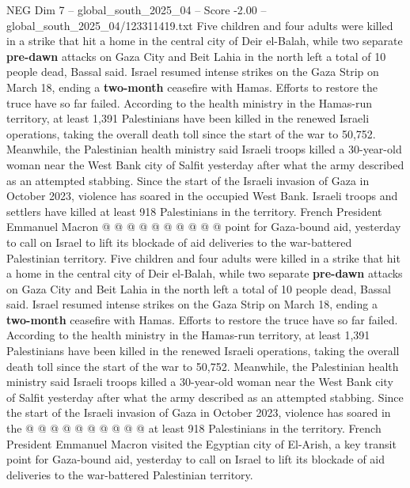 \begin{textsample}{NEG Dim 7 – global\_south\_2025\_04 – Score -2.00 – global\_south\_2025\_04/123311419.txt}  \label{ex:f7_neg_047}
Five children and four adults were killed in a strike that hit a home in the central city of Deir el-Balah, while two separate \textbf{pre-dawn} attacks on Gaza City and Beit Lahia in the north left a total of 10 people dead, Bassal said.
Israel resumed intense strikes on the Gaza Strip on March 18, ending a \textbf{two-month} ceasefire with Hamas.
Efforts to restore the truce have so far failed.
According to the health ministry in the Hamas-run territory, at least 1,391 Palestinians have been killed in the renewed Israeli operations, taking the overall death toll since the start of the war to 50,752.
Meanwhile, the Palestinian health ministry said Israeli troops killed a 30-year-old woman near the West Bank city of Salfit yesterday after what the army described as an attempted stabbing.
Since the start of the Israeli invasion of Gaza in October 2023, violence has soared in the occupied West Bank.
Israeli troops and settlers have killed at least 918 Palestinians in the territory.
French President Emmanuel Macron @ @ @ @ @ @ @ @ @ @ point for Gaza-bound aid, yesterday to call on Israel to lift its blockade of aid deliveries to the war-battered Palestinian territory.
Five children and four adults were killed in a strike that hit a home in the central city of Deir el-Balah, while two separate \textbf{pre-dawn} attacks on Gaza City and Beit Lahia in the north left a total of 10 people dead, Bassal said.
Israel resumed intense strikes on the Gaza Strip on March 18, ending a \textbf{two-month} ceasefire with Hamas.
Efforts to restore the truce have so far failed.
According to the health ministry in the Hamas-run territory, at least 1,391 Palestinians have been killed in the renewed Israeli operations, taking the overall death toll since the start of the war to 50,752.
Meanwhile, the Palestinian health ministry said Israeli troops killed a 30-year-old woman near the West Bank city of Salfit yesterday after what the army described as an attempted stabbing.
Since the start of the Israeli invasion of Gaza in October 2023, violence has soared in the @ @ @ @ @ @ @ @ @ @ at least 918 Palestinians in the territory.
French President Emmanuel Macron visited the Egyptian city of El-Arish, a key transit point for Gaza-bound aid, yesterday to call on Israel to lift its blockade of aid deliveries to the war-battered Palestinian territory.

\end{textsample}

